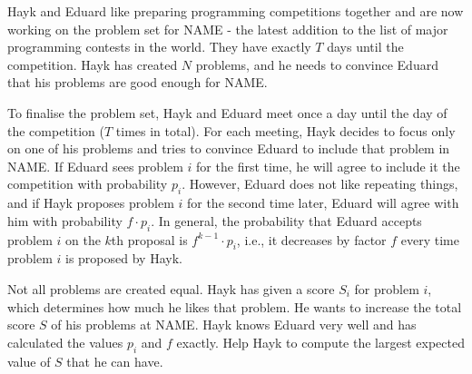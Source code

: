 \newcommand{\compname}{NAME}
Hayk and Eduard like preparing programming competitions together and are now working on the problem set for \compname{} - the latest addition to the list of major programming contests in the world.
They have exactly $T$ days until the competition.
Hayk has created $N$ problems, and he needs to convince Eduard that his problems are good enough for \compname.

To finalise the problem set, Hayk and Eduard meet once a day until the day of the competition ($T$ times in total).
For each meeting, Hayk decides to focus only on one of his problems and 
tries to convince Eduard to include that problem in \compname{}.
If Eduard sees problem $i$ for the first time, he will agree to include it
the competition with probability $p_i$.
However, Eduard does not like repeating things, and if Hayk proposes problem $i$
for the second time later, Eduard will agree with him with probability $f \cdot p_i$.
In general, the probability that Eduard accepts problem $i$ on the $k$th proposal is $f^{k-1}\cdot p_i$, i.e., it decreases by factor $f$ every time problem $i$ is proposed by Hayk.

Not all problems are created equal.
Hayk has given a score $S_i$ for problem $i$, which determines how much he likes that problem.
He wants to increase the total score $S$ of his problems at \compname{}.
Hayk knows Eduard very well and has calculated the values $p_i$ and $f$ exactly.
Help Hayk to compute the largest expected value of $S$ that he can have.
